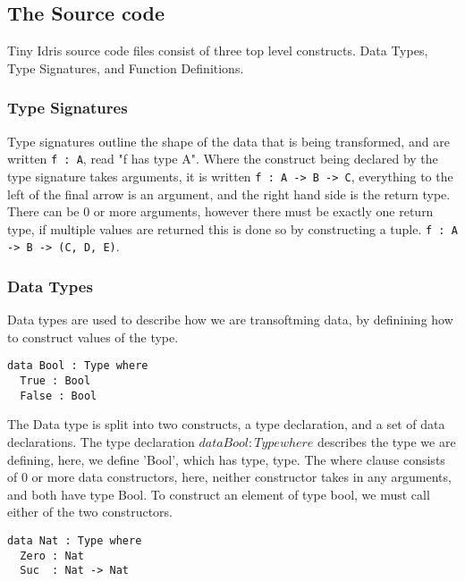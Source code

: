 \documentclass[a4paper]{article}
\begin{document}
\subsection{The Source code}
\label{sec:org7aa2fa2}
Tiny Idris source code files consist of three top level constructs. Data Types, Type Signatures, and Function 
Definitions. 
\subsubsection{Type Signatures}
\label{sec:orgbc86bb8}
Type signatures outline the shape of the data that is being transformed, and are written \texttt{f : A}, read "f has type A".
Where the construct being declared by the type signature takes arguments, it is written \texttt{f : A -> B -> C},
everything to the left of the final arrow is an argument, and the right hand side is the return type. 
There can be 0 or more arguments, however there must be exactly one return type,
if multiple values are returned this is done so by constructing a tuple. \texttt{f : A -> B -> (C, D, E)}.


\subsubsection{Data Types}
\label{sec:orgc6dfee4}
Data types are used to describe how we are transoftming data, by definining how to construct values of the type. 

\begin{center}
\begin{verbatim}
data Bool : Type where
  True : Bool
  False : Bool
\end{verbatim}
\end{center}

The Data type is split into two constructs, a type declaration, and a set of data declarations.
The type declaration \(data Bool : Type where\) describes the type we are defining, here, we define 'Bool',
which has type, type. The where clause consists of 0 or more data constructors, here, neither constructor takes
in any arguments, and both have type Bool. To construct an element of type bool, we must call either of the
two constructors. 

\begin{center}
\begin{verbatim}
data Nat : Type where
  Zero : Nat
  Suc  : Nat -> Nat
\end{verbatim}
\end{center}
\end{document}
